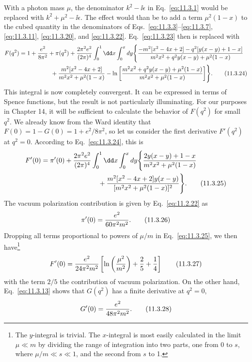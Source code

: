With a photon mass $\mu$, the denominator $k^2-\ii\epsilon$ in Eq.~\eqref{eq:11.3.1}
would be replaced with $k^2+\mu^2-\ii\epsilon$. The effect would than be to add
a term $\mu^2(1-x)$ to the cubed quantity in the denominators of
Eqs.~\eqref{eq:11.3.3}--\eqref{eq:11.3.7}, \eqref{eq:11.3.11}, \eqref{eq:11.3.20}, and \eqref{eq:11.3.22}. Eq.~\eqref{eq:11.3.23}
then is replaced with
\begin{align}
F(q^2)={}&1+{e^2\over8\pi^2}+\pi(q^2)
 +{2\pi^2e^2\over(2\pi)^4}\int_0^1\dd x\int_0^xdy
 \Biggl\{{-m^2[x^2-4x+2]-q^2[y(x-y)+1-x]
 \over m^2x^2+q^2y(x-y)+\mu^2(1-x)}\notag\\
&\hspace{14mm}+{m^2[x^2-4x+2]\over m^2x^2+\mu^2(1-x)}
 -\ln\left[{m^2x^2+q^2y(x-y)+\mu^2(1-x)
 \over m^2x^2+\mu^2(1-x)}\right]\Biggr\}.
\tag{11.3.24}\label{eq:11.3.24}
\end{align}
This integral is now completely convergent. It can be expressed in terms of
Spence functions, but the result is not particularly illuminating. For our
purposes in Chapter 14, it will be sufficient to calculate the behavior of
$F(q^2)$ for small $q^2$. We already know from the Ward identity that
$F(0)=1-G(0)=1+e^2/8\pi^2$, so let us consider the first derivative $F'(q^2)$
at $q^2=0$. According to Eq.~\eqref{eq:11.3.24}, this is
\begin{align}
F'(0)={}&\pi'(0)+{2\pi^2e^2\over(2\pi)^4}
 \int_0^1\dd x\int_0^xdy
 \Biggl\{{2y(x-y)+1-x\over m^2x^2+\mu^2(1-x)}\notag\\
&\hspace{25mm}+{m^2[x^2-4x+2]y(x-y)
 \over[m^2x^2+\mu^2(1-x)]^2}\Biggr\}.
\tag{11.3.25}\label{eq:11.3.25}
\end{align}
The vacuum polarization contribution is given by Eq.~\eqref{eq:11.2.22} as
\begin{equation}
\pi'(0)={e^2\over60\pi^2m^2}.
\tag{11.3.26}\label{eq:11.3.26}
\end{equation}
Dropping all terms proportional to powers of $\mu/m$ in Eq.~\eqref{eq:11.3.25}, we
then have\footnote{The $y$-integral is trivial. The $x$-integral is most
easily calculated in the limit $\mu\ll m$ by dividing the range of integration
into two parts, one from 0 to $s$, where $\mu/m\ll s\ll1$, and the second from
$s$ to 1.}
\begin{equation}
F'(0)={e^2\over24\pi^2m^2}
 \left[\ln\left({\mu^2\over m^2}\right)+{2\over5}+{1\over4}\right]
\tag{11.3.27}\label{eq:11.3.27}
\end{equation}
with the term $2/5$ the contribution of vacuum polarization. On the other
hand, Eq.~\eqref{eq:11.3.13} shows that $G(q^2)$ has a finite derivative at $q^2=0$,
\begin{equation}
G'(0)={e^2\over48\pi^2m^2}.
\tag{11.3.28}\label{eq:11.3.28}
\end{equation}

